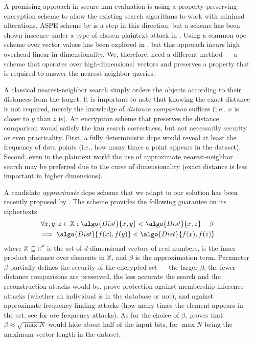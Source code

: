 		A promising approach in secure \acrshort{knn} evaluation is using a property-preserving encryption scheme to allow the existing search algorithms to work with minimal alterations.
		ASPE scheme by \textcite{knn-aspe} is a step in this direction, but a scheme has been shown insecure under a type of chosen plaintext attack in \cite{secure-nn-revisited-break-aspe}.
		Using a common \acrshort{ope} scheme over vector values has been explored in \cite{quick-n}, but this approach incurs high overhead linear in dimensionality.
		We, therefore, need a different method --- a scheme that operates over high-dimensional vectors and preserves a property that is required to answer the nearest-neighbor queries.

		A classical nearest-neighbor search \cite{knn-wong,knn-cunningham} simply orders the objects according to their distances from the target.
		It is important to note that knowing the exact distance is not required, merely the knowledge of \emph{distance comparison} suffices (i.e., $x$ is closer to $y$ than $z$ is).
		An encryption scheme that preserves the distance comparison would satisfy the \acrshort{knn} search correctness, but not necessarily security or even practicality.
		First, a fully deterministic \acrfull{dcpe} would reveal at least the frequency of data points (i.e., how many times a point appears in the dataset).
		Second, even in the plaintext world the use of approximate nearest-neighbor search \cite{scalable-nn,approximate-nn-fixed-d} may be preferred due to the curse of dimensionality \cite{nn-meaningful,nn-curse-of-d} (exact distance is less important in higher dimensions).

		A candidate \emph{approximate} \acrshort{dcpe} scheme that we adapt to our solution has been recently proposed by \textcite{dcpe}.
		The scheme provides the following guarantee on its ciphertexts
		\begin{multline*}
			\forall x, y, z \in \mathbb{X} : \algo{Dist}{x, y} < \algo{Dist}{x, z} - \beta \\
			\implies \algo{Dist}{f(x), f(y)} < \algo{Dist}{f(x), f(z)}
		\end{multline*}
		where $\mathbb{X} \subseteq \mathbb{R}^d$ is the set of $d$-dimensional vectors of real numbers,  is the inner product distance over elements in $\mathbb{X}$, and $\beta$ is the approximation term.
		Parameter $\beta$ partially defines the security of the encrypted set --- the larger $\beta$, the fewer distance comparisons are preserved, the less accurate the search and the reconstruction attacks would be.
		\textcite{dcpe} prove protection against membership inference attacks \cite{memebership-inference-attacks-knn} (whether an individual is in the database or not), and against approximate frequency-finding attacks (how many times the element appears in the set, see \cite{leakage-abuse-grubs-2017} for \acrshort{ore} frequency attacks).
		As for the choice of $\beta$, \textcite{dcpe} proves that $\beta \approx \sqrt{\max N}$ would hide about half of the input bits, for $\max N$ being the maximum vector length in the dataset.

